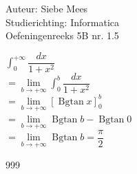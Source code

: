 \documentclass[a4paper]{article}
\newcommand{\Bgtan}{\operatorname{Bgtan}}
\begin{document}
  
\noindent \large Auteur: Siebe Mees \\
\noindent \large Studierichting: Informatica\\
\noindent \large Oefeningenreeks 5B nr. 1.5\\

\medskip

\normalsize

$ \displaystyle\int_0^{+\infty} \dfrac{dx}{1+x^2} $\\

$ = \lim\limits_{b \rightarrow +\infty} \displaystyle\int_0^b \dfrac{dx}{1+x^2} $\\

$ = \lim\limits_{b \rightarrow +\infty} \left[ \Bgtan x \right]_0^b $\\

$ = \lim\limits_{b \rightarrow +\infty} \Bgtan b - \Bgtan 0 $\\

$ = \lim\limits_{b \rightarrow +\infty} \Bgtan b = \dfrac{\pi}{2} $\\

\begin{thebibliography}{999}
\end{thebibliography}
\end{document}
